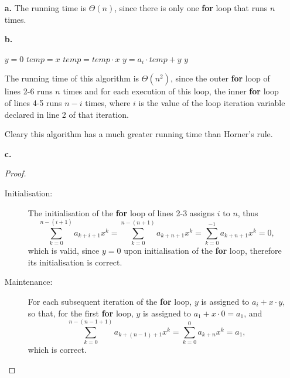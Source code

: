 
\begin{itemize}
    \item[\textbf{a.}] The running time is $\Theta(n)$, since there is only one 
        \textbf{for} loop that runs $n$ times.
    \item[\textbf{b.}]
        \begin{algorithmic}[1]
            \STATE $y = 0$
                \STATE $\mathit{temp} = x$
                    \STATE $\mathit{temp} = \mathit{temp} \cdot x$
                \ENDFOR
                \STATE $y = a_i \cdot temp + y$
            \ENDFOR
            \RETURN $y$
        \end{algorithmic}
        The running time of this algorithm is $\Theta(n^2)$, since the outer 
        \textbf{for} loop of lines 2-6 runs $n$ times and for each execution of
        this loop, the inner \textbf{for} loop of lines 4-5 runs $n - i$ times,
        where $i$ is the value of the loop iteration variable declared in line 2
        of that iteration.

        Cleary this algorithm has a much greater running time than Horner's rule.
    \item[\textbf{c.}] 
        \begin{proof}
            \begin{description}
                \item[Initialisation:] The initialisation of the \textbf{for}
                    loop of lines 2-3 assigns $i$ to $n$, thus
                    \[
                        \sum_{k = 0}^{n - (i + 1)} a_{k + i + 1}x^k
                        = \sum_{k = 0}^{n - (n + 1)} a_{k + n + 1} x^k
                        = \sum_{k = 0}^{-1} a_{k + n + 1} x^k
                        = 0,
                    \]
                    which is valid, since $y = 0$ upon initialisation of the
                    \textbf{for} loop, therefore its initialisation is correct.
                \item[Maintenance:] For each subsequent iteration of the \textbf{for}
                    loop, $y$ is assigned to $a_i + x \cdot y$, so that, for the first
                    \textbf{for} loop, $y$ is assigned to $a_1 + x \cdot 0 = a_1$,
                    and
                    \[
                        \sum_{k = 0}^{n - (n - 1 + 1)} a_{k + (n - 1) + 1} x^k
                        = \sum_{k = 0}^0 a_{k + n} x^k = a_1,
                    \]
                    which is correct.


\end{description}
\end{proof}
\end{itemize}
